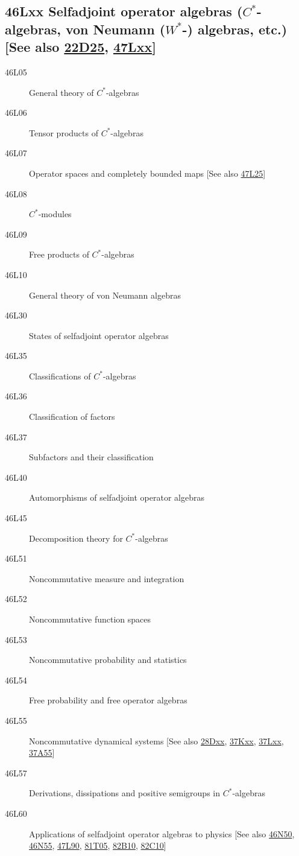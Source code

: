 \subsection*{46Lxx  Selfadjoint operator algebras ($C^*$-algebras, von Neumann ($W^*$-) algebras, etc.) [See also \hyperref[22D25]{22D25}, \hyperref[47Lxx]{47Lxx}] }\label{46Lxx}
\begin{description}  
\item [46L05]\label{46L05} General theory of $C^*$-algebras
\item [46L06]\label{46L06} Tensor products of $C^*$-algebras
\item [46L07]\label{46L07} Operator spaces and completely bounded maps [See also \hyperref[47L25]{47L25}]
\item [46L08]\label{46L08} $C^*$-modules
\item [46L09]\label{46L09} Free products of $C^*$-algebras
\item [46L10]\label{46L10} General theory of von Neumann algebras
\item [46L30]\label{46L30} States of selfadjoint operator algebras
\item [46L35]\label{46L35} Classifications of $C^*$-algebras
\item [46L36]\label{46L36} Classification of factors
\item [46L37]\label{46L37} Subfactors and their classification
\item [46L40]\label{46L40} Automorphisms of selfadjoint operator algebras
\item [46L45]\label{46L45} Decomposition theory for $C^*$-algebras
\item [46L51]\label{46L51} Noncommutative measure and integration
\item [46L52]\label{46L52} Noncommutative function spaces
\item [46L53]\label{46L53} Noncommutative probability and statistics
\item [46L54]\label{46L54} Free probability and free operator algebras
\item [46L55]\label{46L55} Noncommutative dynamical systems [See also \hyperref[28Dxx]{28Dxx},  \hyperref[37Kxx]{37Kxx}, \hyperref[37Lxx]{37Lxx}, \hyperref[37A55]{37A55}]
\item [46L57]\label{46L57} Derivations, dissipations and positive semigroups in $C^*$-algebras
\item [46L60]\label{46L60} Applications of selfadjoint operator algebras to physics [See also \hyperref[46N50]{46N50}, \hyperref[46N55]{46N55}, \hyperref[47L90]{47L90}, \hyperref[81T05]{81T05}, \hyperref[82B10]{82B10}, \hyperref[82C10]{82C10}]

\end{description}
